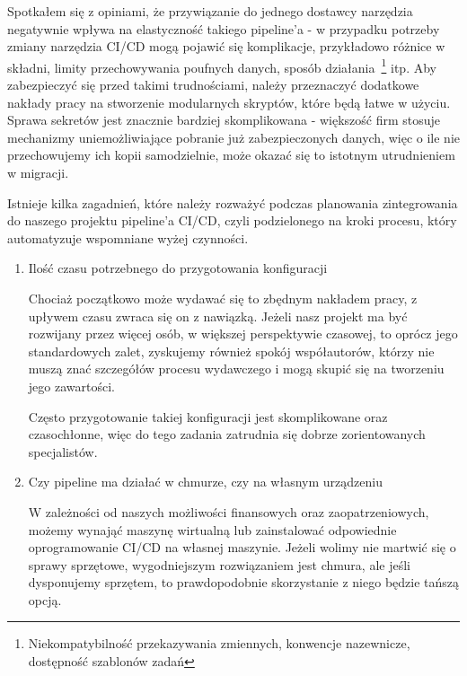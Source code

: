 Spotkałem się z opiniami, że przywiązanie do jednego dostawcy narzędzia negatywnie wpływa na elastyczność 
takiego pipeline'a - w przypadku potrzeby zmiany narzędzia CI/CD mogą pojawić się komplikacje, 
przykładowo różnice w składni, limity przechowywania poufnych danych, sposób działania~\footnote[2]{
    Niekompatybilność przekazywania zmiennych, konwencje nazewnicze, dostępność szablonów zadań
} itp.
Aby zabezpieczyć się przed takimi trudnościami, należy przeznaczyć dodatkowe nakłady pracy na stworzenie 
modularnych skryptów, które będą łatwe w użyciu.
Sprawa sekretów jest znacznie bardziej skomplikowana - większość firm stosuje mechanizmy uniemożliwiające pobranie już 
zabezpieczonych danych, więc o ile nie przechowujemy ich kopii samodzielnie, może okazać się to istotnym utrudnieniem w migracji.

Istnieje kilka zagadnień, które należy rozważyć podczas planowania zintegrowania do naszego projektu pipeline'a CI/CD,
czyli podzielonego na kroki procesu, który automatyzuje wspomniane wyżej czynności.
\begin{enumerate}
    \item Ilość czasu potrzebnego do przygotowania konfiguracji

    Chociaż początkowo może wydawać się to zbędnym nakładem pracy, z upływem czasu zwraca się on z nawiązką.
    Jeżeli nasz projekt ma być rozwijany przez więcej osób, w większej perspektywie czasowej, 
    to oprócz jego standardowych zalet, zyskujemy również spokój współautorów, 
    którzy nie muszą znać szczegółów procesu wydawczego i mogą skupić się na tworzeniu jego zawartości.

    Często przygotowanie takiej konfiguracji jest skomplikowane oraz \\ czasochłonne, 
    więc do tego zadania zatrudnia się dobrze zorientowanych specjalistów.

    \item Czy pipeline ma działać w chmurze, czy na własnym urządzeniu

    W zależności od naszych możliwości finansowych oraz zaopatrzeniowych, możemy wynająć maszynę wirtualną
    lub zainstalować odpowiednie oprogramowanie CI/CD na własnej maszynie. 
    Jeżeli wolimy nie martwić się o sprawy sprzętowe, wygodniejszym rozwiązaniem jest chmura,
    ale jeśli dysponujemy sprzętem, to prawdopodobnie skorzystanie z niego będzie tańszą opcją. 
\end{enumerate}


